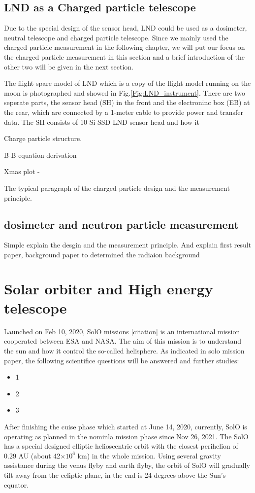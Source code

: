 \subsection{LND as a Charged particle telescope}

Due to the special design of the sensor head, \ac{LND} could be used as a dosimeter, neutral telescope and charged particle telescope. Since we mainly used the charged particle measurement in the following chapter, we will put our focus on the charged particle measurement in this section and a brief introduction of the other two will be given in the next section.

The flight spare model of \ac{LND} which is a copy of the flight model running on the moon is photographed and showed in Fig.\ref{Fig:LND_instrument}. There are two seperate parts, the sensor head (SH) in the front and the electroninc box (EB) at the rear, which are connected by a 1-meter cable to provide power and transfer data. 
The SH consists of 10 Si \acs{SSD}
LND sensor head and how it 

Charge particle structure.

B-B equation derivation

Xmas plot - 

The typical paragraph of the charged particle design and the measurement principle.



\subsection{dosimeter and neutron particle measurement}
Simple explain the desgin and the measurement principle.
And explain first result paper, background paper to determined the radiaion background




\section{Solar orbiter and High energy telescope}

Launched on Feb 10, 2020, \acl{SolO} missions [citation] is an international mission cooperated between \ac{ESA} and \ac{NASA}. The aim of this mission is to understand the sun and how it control the so-called helisphere. As indicated in solo mission paper, the following scientifice questions will be answered and further studies:
\begin{itemize}
	\item 1
	\item 2
	\item 3
\end{itemize}
After finishing the cuise phase which started at June 14, 2020, currently, \ac{SolO} is operating as planned in the nominla mission phase since Nov 26, 2021.
The \ac{SolO} has a special designed elliptic helioscentric orbit with the closest perihelion of 0.29 AU (about 42$\times10^6$ km) in the whole mission. Using several gravity assistance during the venus flyby and earth flyby, the orbit of SolO will gradually tilt away from the ecliptic plane, in the end is 24 degrees above the Sun's equator.

